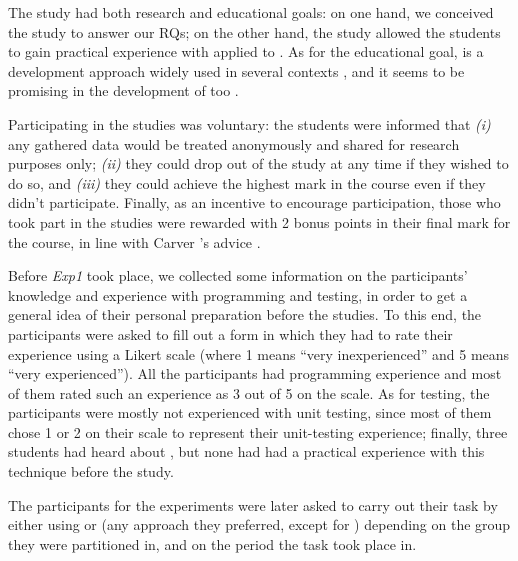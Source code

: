 The study had both research and educational goals: on one hand, we conceived the study to answer our RQs; on the other hand, the study allowed the students to gain practical experience with \tdd applied to \ess. As for the educational goal, \tdd is a development approach widely used in several contexts \cite{DBLP:conf/esem/RomanoZBPS22}, and it seems to be promising in the development of \ess too \cite{TDDEC}.

Participating in the studies was voluntary: the students were informed that \textit{(i)} any gathered data would be treated anonymously and shared for research purposes only; \textit{(ii)} they could drop out of the study at any time if they wished to do so, and \textit{(iii)} they could achieve the highest mark in the course even if they didn't participate. Finally, as an incentive to encourage participation, those who took part in the studies were rewarded with 2 bonus points in their final mark for the course, in line with Carver \etal's advice \cite{DBLP:conf/metrics/CarverJMS03}.

Before \textit{Exp1} took place, we collected some information on the participants' knowledge and experience with programming and testing, in order to get a general idea of their personal preparation before the studies. To this end, the participants were asked to fill out a form in which they had to rate their experience using a Likert scale (where 1 means “very inexperienced” and 5 means “very experienced”). All the participants had programming experience and most of them rated such an experience as 3 out of 5 on the scale. 
As for testing, the participants were mostly not experienced with unit testing, since most of them chose 1 or 2 on their scale to represent their unit-testing experience; finally, three students had heard about \tdd, but none had had a practical experience with this technique before the study.

The participants for the experiments were later asked to carry out their task by either using \tdd or \notdd (\ie any approach they preferred, except for \tdd) depending on the group they were partitioned in, and on the period the task took place in. 





